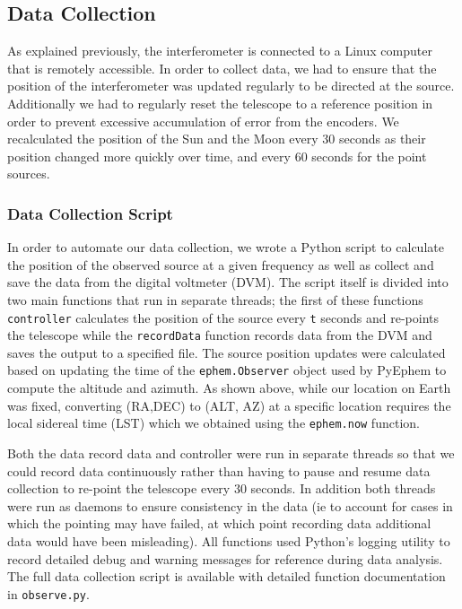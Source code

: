 \documentclass{article}
\begin{document}
  \subsection{Data Collection}
  As explained previously, the interferometer is connected to a Linux computer
  that is remotely accessible. In order to collect data, we had to ensure that
  the position of the interferometer was updated regularly to be directed at the
  source. Additionally we had to regularly reset the telescope to a reference
  position in order to prevent excessive accumulation of error from the
  encoders. We recalculated the position of the Sun and the Moon every 30
  seconds as their position changed more quickly over time, and every 60 seconds for
  the point sources.

  \subsubsection{Data Collection Script}
  In order to automate our data collection, we wrote a Python script to
  calculate the position of the observed source at a given frequency as well as
  collect and save the data from the digital voltmeter (DVM). The script itself is
  divided into two main functions that run in separate threads; the first of
  these functions \lstinline{controller} calculates the position of the source
  every \lstinline{t} seconds and re-points the telescope while the
  \lstinline{recordData} function records data from the DVM and saves the output
  to a specified file. The source position updates were calculated based on
  updating the time of the \lstinline{ephem.Observer} object used by PyEphem to
  compute the altitude and azimuth. As shown above, while our location on Earth
  was fixed, converting (RA,DEC) to (ALT, AZ) at a specific location requires
  the local sidereal time (LST) which we obtained using the
  \lstinline{ephem.now} function.

  Both the data record data and controller were run in separate threads so that
  we could record data continuously rather than having to pause and resume data
  collection to re-point the telescope every 30 seconds. In addition both
  threads were run as daemons to ensure consistency in the data (ie to account
  for cases in which the pointing may have failed, at which point recording data
  additional data would have been misleading). All functions used Python's
  logging utility to record detailed debug and warning messages for reference
  during data analysis. The full data collection script is available with
  detailed function documentation in \lstinline{observe.py}.
\end{document}

